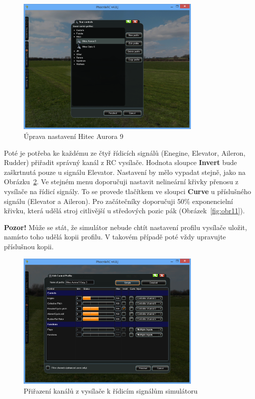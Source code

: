 \documentclass[11pt, a4paper]{article}
\begin{document}
\begin{figure}[h]
\begin{center}
\includegraphics[width=0.8\textwidth]{fig/9.PNG}
\caption{Úprava nastavení Hitec Aurora 9}
\label{fig:obr9}
\end{center}
\end{figure}

Poté je potřeba ke každému ze čtyř řídicích signálů (Enegine, Elevator, Aileron, Rudder) přiřadit správný kanál z RC vysílače. Hodnota sloupce \textbf{Invert} bude zaškrtnutá pouze u signálu Elevator. Nastavení by mělo vypadat stejně, jako na Obrázku~\ref{fig:obr10}. Ve stejném menu doporučuji nastavit nelineární křivky přenosu z vysílače na řídicí signály. To se provede tlačítkem ve sloupci \textbf{Curve} u příslušného signálu (Elevator a Aileron). Pro začátečníky doporučuji 50\% exponencielní křivku, která udělá stroj citlivější u středových pozic pák (Obrázek~\ref{fig:obr11}).

\textbf{Pozor!} Může se stát, že simulátor nebude chtít nastavení profilu vysílače uložit, namísto toho udělá kopii profilu. V takovém případě poté vždy upravujte příslušnou kopii. 

\begin{figure}[h]
\begin{center}
\includegraphics[width=0.8\textwidth]{fig/10.PNG}
\caption{Přiřazení kanálů z vysílače k řídicím signálům simulátoru}
\label{fig:obr10}
\end{center}
\end{figure}
\end{document}
